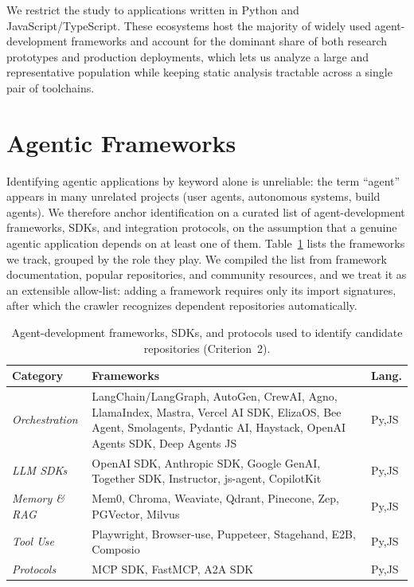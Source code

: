 We restrict the study to applications written in Python and JavaScript/TypeScript. These ecosystems host the majority of widely used agent-development frameworks and account for the dominant share of both research prototypes and production deployments, which lets us analyze a large and representative population while keeping static analysis tractable across a single pair of toolchains.

\section{Agentic Frameworks}
\label{sec:frameworks}
 
Identifying agentic applications by keyword alone is unreliable: the term ``agent'' appears in many unrelated projects (user agents, autonomous systems, build agents). We therefore anchor identification on a curated list of agent-development frameworks, SDKs, and integration protocols, on the assumption that a genuine agentic application depends on at least one of them. Table~\ref{tab:frameworks} lists the frameworks we track, grouped by the role they play. We compiled the list from framework documentation, popular repositories, and community resources, and we treat it as an extensible allow-list: adding a framework requires only its import signatures, after which the crawler recognizes dependent repositories automatically.
 
\begin{table}[t]
\centering
\renewcommand{\arraystretch}{1.1}
\setlength{\tabcolsep}{3pt}
\scriptsize
\caption{Agent-development frameworks, SDKs, and protocols used to identify
candidate repositories (Criterion~2).}
\label{tab:frameworks}
\begin{tabular}{@{}>{\raggedright\arraybackslash}p{}
                  >{\raggedright\arraybackslash}p{}
                  >{\raggedright\arraybackslash}p{}@{}}
\toprule
\textbf{Category} & \textbf{Frameworks} & \textbf{Lang.} \\
\midrule
\emph{Orchestration} & 
  LangChain/LangGraph, AutoGen, CrewAI, Agno, LlamaIndex, Mastra,
  Vercel AI SDK, ElizaOS, Bee Agent, Smolagents, Pydantic AI, Haystack,
  OpenAI Agents SDK, Deep Agents JS &
  Py,JS \\
\emph{LLM SDKs} & 
  OpenAI SDK, Anthropic SDK, Google GenAI, Together SDK, Instructor,
  js-agent, CopilotKit &
  Py,JS \\
\emph{Memory \& RAG} & 
  Mem0, Chroma, Weaviate, Qdrant, Pinecone, Zep, PGVector, Milvus &
  Py,JS \\
\emph{Tool Use} & 
  Playwright, Browser-use, Puppeteer, Stagehand, E2B, Composio &
  Py,JS \\
\emph{Protocols} & 
  MCP SDK, FastMCP, A2A SDK &
  Py,JS \\
\bottomrule
\end{tabular}
\end{table}

